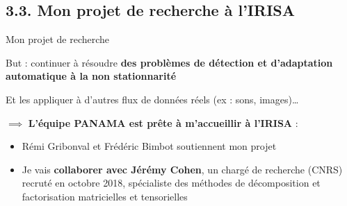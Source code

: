\documentclass[11pt,english,ignorenonframetext,]{beamer}
\providecommand{\tightlist}{%
  \setlength{\itemsep}{0pt}\setlength{\parskip}{0pt}}
\begin{document}
\subsection{\hfill{}3.3. Mon projet de recherche à l'IRISA\hfill{}}

\begin{frame}{Mon projet de recherche }


But : continuer à résoudre \alert{\textbf{des problèmes de détection et d'adaptation automatique à la non stationnarité}}

Et les appliquer à d'autres flux de données réels (ex : sons, images)\ldots


\vspace*{15pt}
\pause

$\implies$ \textbf{L'équipe PANAMA est prête à m'accueillir à l'IRISA} :
\begin{itemize}
\item
  Rémi Gribonval et Frédéric Bimbot soutiennent mon projet
\pause
\item
  Je vais \textbf{collaborer avec Jérémy Cohen},
  un chargé de recherche (CNRS) recruté en octobre 2018,
  spécialiste des méthodes de décomposition et factorisation matricielles et tensorielles
\end{itemize}




\end{frame}
\end{document}
